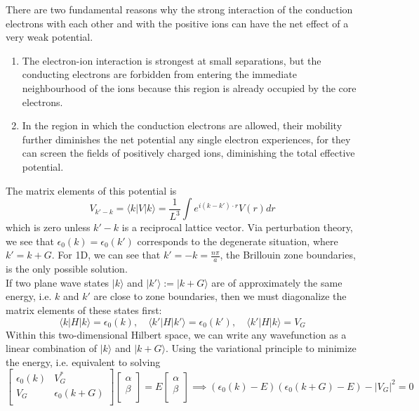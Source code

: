 \documentclass[a4paper]{article}
\begin{document}
\begin{Note}
There are two fundamental reasons why the strong interaction of the conduction electrons with each other and with the positive ions can have the net effect of a very weak potential.
\begin{enumerate}
    \item The electron-ion interaction is strongest at small separations, but the conducting electrons are forbidden from entering the immediate neighbourhood of the ions because this region is already occupied by the core electrons.
    \item In the region in which the conduction electrons are allowed, their mobility further diminishes the net potential any single electron experiences, for they can screen the fields of positively charged ions, diminishing the total effective potential.
\end{enumerate}
The matrix elements of this potential is
$$V_{k'-k}=\langle k|V|k\rangle=\frac{1}{L^3}\int e^{i(k-k')\cdot r}V(r)dr$$
which is zero unless $k'-k$ is a reciprocal lattice vector. Via perturbation theory, we see that $\epsilon_0(k)=\epsilon_0(k')$ corresponds to the degenerate situation, where $k'=k+G$. For 1D, we can see that $k'=-k=\frac{n\pi}{a}$, the Brillouin zone boundaries, is the only possible solution.\\[5pt]
If two plane wave states $|k\rangle$ and $|k'\rangle:=|k+G\rangle$ are of approximately the same energy, i.e. $k$ and $k'$ are close to zone boundaries, then we must diagonalize the matrix elements of these states first:
$$\langle k|H|k\rangle=\epsilon_0(k),\quad\langle k'|H|k'\rangle=\epsilon_0(k'),\quad\langle k'|H|k\rangle=V_G$$
Within this two-dimensional Hilbert space, we can write any wavefunction as a linear combination of $|k\rangle$ and $|k+G\rangle$. Using the variational principle to minimize the energy, i.e. equivalent to solving
$$\begin{bmatrix}\epsilon_0(k)&V_G^*\\V_G&\epsilon_0(k+G)\\\end{bmatrix}\begin{bmatrix}\alpha\\\beta\\\end{bmatrix}=E\begin{bmatrix}\alpha\\\beta\\\end{bmatrix}\implies(\epsilon_0(k)-E)(\epsilon_0(k+G)-E)-|V_G|^2=0$$

\end{Note}
\end{document}
